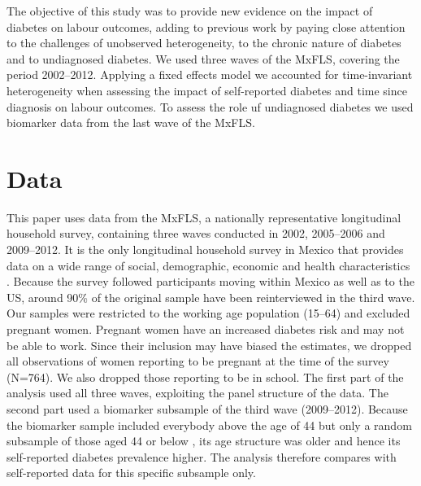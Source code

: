 \documentclass[12pt,english]{article}
\begin{document}
The objective of this study was to provide new evidence on the impact of diabetes on labour outcomes, adding to previous work by paying close attention to the challenges of unobserved heterogeneity, to the chronic nature of diabetes and to undiagnosed diabetes. We used three waves of the \ac{MxFLS}, covering the period 2002--2012. Applying a fixed effects model we accounted for time-invariant heterogeneity when assessing the impact of self-reported diabetes and time since diagnosis on labour outcomes. To assess the role uf undiagnosed diabetes we used biomarker data from the last wave of the \ac{MxFLS}.

\section{\label{sec:Data}Data}

This paper uses data from the \acf{MxFLS}, a nationally representative longitudinal household survey, containing three waves conducted in 2002, 2005--2006 and 2009--2012. It is the only longitudinal household survey in Mexico that provides data on a wide range of social, demographic, economic and health characteristics \parencite{Rubalcava2013}. Because the survey followed participants moving within Mexico as well as to the US, around 90\% of the original sample have been reinterviewed in the third wave. Our samples were restricted to the working age population (15--64) and excluded pregnant women. Pregnant women have an increased diabetes risk and may not be able to work. Since their inclusion may have biased the estimates, we dropped all observations of women reporting to be pregnant at the time of the survey (N=764). We also dropped those reporting to be in school. The first part of the analysis used all three waves, exploiting the panel structure of the data. The second part used a biomarker subsample of the third wave (2009--2012). Because the biomarker sample included everybody above the age of 44 but only a random subsample of those aged 44 or below \parencite{Crimmins2015}, its age structure was older and hence its self-reported diabetes prevalence higher. The analysis therefore compares with self-reported data for this specific subsample only.
\end{document}

